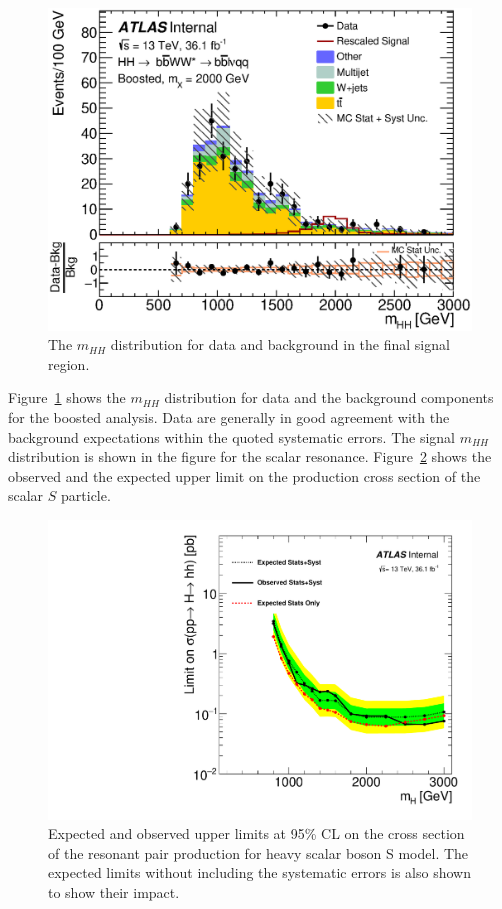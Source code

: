 \begin{figure}[h]
\begin{center}
\includegraphics[scale=0.65]{figures/C_2tab_SR_lepton_presel_met50_hhMassRebin1}
\caption{The ${m_{HH}}$ distribution for data and background in the final signal region.}
\label{fig:fully_boost_mhh}
\end{center}
\end{figure}


Figure~\ref{fig:fully_boost_mhh} shows the $m_{HH}$ distribution for
data and the background components for the boosted analysis.
Data are generally in good agreement with the background expectations within the quoted systematic errors.
The signal $m_{HH}$ distribution is shown in the figure for  the scalar resonance.
Figure~\ref{fig:boosted_only_limits_new} shows the observed and the expected
upper limit on the production cross section of the scalar $S$ particle.

\begin{figure}[h]
\begin{center}
\includegraphics[scale=0.65]{figures/Final_limits}
\caption{Expected and observed upper limits at 95\% CL on the cross section of the resonant pair production for heavy scalar boson S model. The expected limits without including the systematic errors is also shown to show their impact.}
\label{fig:boosted_only_limits_new}
\end{center}
\end{figure}

